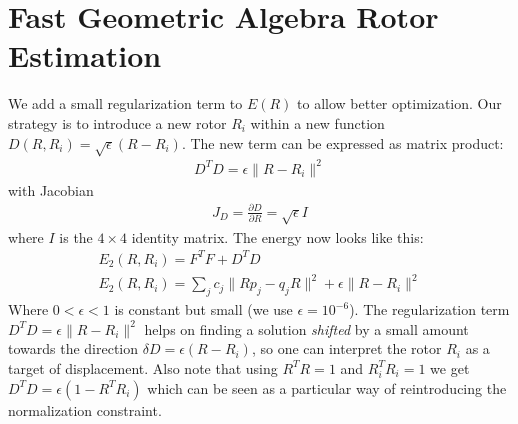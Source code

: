 \documentclass{birkjour}
\numberwithin{equation}{section}
\begin{document}
\section{Fast Geometric Algebra Rotor Estimation}

We add a small regularization term to $E(R)$ to allow better optimization. Our strategy is to introduce a new rotor $R_i$ within a new function $D(R, R_i) = \sqrt{\epsilon} (R - R_i)$.
The new term can be expressed as matrix product:
\begin{eqnarray*}
D^T D = \epsilon \|R - R_i\|^2
\end{eqnarray*}
with Jacobian 
\begin{eqnarray*}
J_D = \frac{\partial D}{\partial R} = \sqrt{\epsilon} I
\end{eqnarray*}
where $I$ is the $4\times4$ identity matrix. The energy now looks like this:
\begin{eqnarray*}
E_2(R, R_i) = F^T F + D^T D\\
E_2(R, R_i) = \sum_j { c_{j} \|R p_j - q_j R\|^2 } + \epsilon \|R - R_i\|^2
\end{eqnarray*}
Where $0 < \epsilon < 1$ is constant but small (we use $\epsilon = 10^{-6}$). The regularization term $D^T D = \epsilon \|R - R_i\|^2$ helps on finding a solution \emph{shifted} by a small amount towards the direction $\delta D = \epsilon (R - R_i)$, so one can interpret the rotor $R_i$ as a target of displacement. Also note that using $R^T R = 1$ and $R_i^T R_i = 1$ we get $D^T D = \epsilon (1 - R^T R_i)$ which can be seen as a particular way of reintroducing the normalization constraint. 
\end{document}
